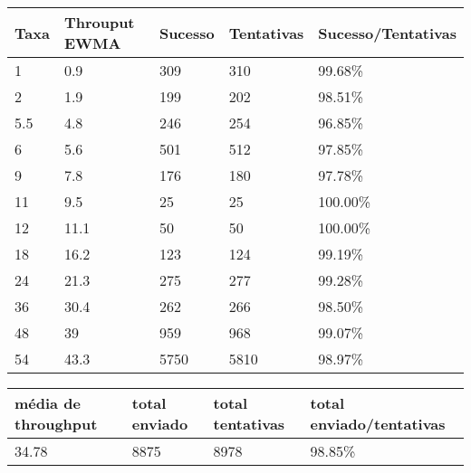 \documentclass[10pt,a4paper]{article}
\begin{document}
\vspace{-5mm}


\centering
\begin{tabular}{lllll}
Taxa & Throuput EWMA & Sucesso & Tentativas & Sucesso/Tentativas   \tabularnewline
\hline
1 & 0.9 & 309 & 310 & 99.68\% \tabularnewline
2 & 1.9 & 199 & 202 & 98.51\% \tabularnewline
5.5 & 4.8 & 246 & 254 & 96.85\% \tabularnewline
6 & 5.6 & 501 & 512 & 97.85\% \tabularnewline
9 & 7.8 & 176 & 180 & 97.78\% \tabularnewline
11 & 9.5 & 25 & 25 & 100.00\% \tabularnewline
12 & 11.1 & 50 & 50 & 100.00\% \tabularnewline
18 & 16.2 & 123 & 124 & 99.19\%\tabularnewline
24 & 21.3 & 275 & 277 & 99.28\% \tabularnewline
36 & 30.4 & 262 & 266 & 98.50\% \tabularnewline
48 & 39 & 959 & 968 & 99.07\% \tabularnewline
54 & 43.3 & 5750 & 5810 & 98.97\% \tabularnewline
\end{tabular}
\begin{tabular}{llll}
 média de throughput & total enviado & total tentativas & total enviado/tentativas   \tabularnewline
\hline
 34.78 & 8875 & 8978 & 98.85\% \tabularnewline
\end{tabular}
\end{document}
